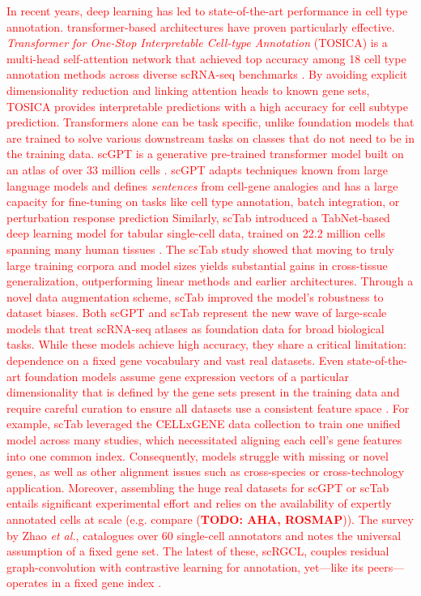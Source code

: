 \documentclass{article}
\newcommand{\gpt}[1]{\textcolor{red}{#1}}
\begin{document}
\gpt{In recent years, deep learning has led to state-of-the-art performance in cell type annotation. transformer-based architectures have proven particularly effective. \textit{Transformer for One-Stop Interpretable Cell-type Annotation} (TOSICA) is a multi-head self-attention network that achieved top accuracy among 18 cell type annotation methods across diverse scRNA-seq benchmarks \cite{chen2023transformer}. By avoiding explicit dimensionality reduction and linking attention heads to known gene sets, TOSICA provides interpretable predictions with a high accuracy for cell subtype prediction. 
Transformers alone can be task specific, unlike foundation models that are trained to solve various downstream tasks on classes that do not need to be in the training data. 
scGPT is a generative pre-trained transformer model built on an atlas of over 33 million cells \cite{cui2024scgpt}. scGPT adapts techniques known from large language models and defines \textit{sentences} from cell-gene analogies and has a large capacity for fine-tuning on tasks like cell type annotation, batch integration, or perturbation response prediction
Similarly, scTab introduced a TabNet-based deep learning model for tabular single-cell data, trained on 22.2 million cells spanning many human tissues \cite{fischer2024sctab}. The scTab study showed that moving to truly large training corpora and model sizes yields substantial gains in cross-tissue generalization, outperforming linear methods and earlier architectures. Through a novel data augmentation scheme, scTab improved the model's robustness to dataset biases. Both scGPT and scTab represent the new wave of large-scale models that treat scRNA-seq atlases as foundation data for broad biological tasks. While these models achieve high accuracy, they share a critical limitation: dependence on a fixed gene vocabulary and vast real datasets. Even state-of-the-art foundation models assume gene expression vectors of a particular dimensionality that is defined by the gene sets present in the training data and require careful curation to ensure all datasets use a consistent feature space \cite{fischer2024sctab}. For example, scTab leveraged the CELLxGENE data collection to train one unified model across many studies, which necessitated aligning each cell's gene features into one common index. Consequently, models struggle with missing or novel genes, as well as other alignment issues such as cross-species or cross-technology application. Moreover, assembling the huge real datasets for scGPT or scTab entails significant experimental effort and relies on the availability of expertly annotated cells at scale (e.g. compare \cite{flotho2024zebra, grandke2025single} (\textbf{TODO: AHA, ROSMAP})). The survey by Zhao \textit{et al.},\cite{zhao2023survey} catalogues over 60 single-cell annotators and notes the universal assumption of a fixed gene set. The latest of these, scRGCL, couples residual graph-convolution with contrastive learning for annotation, yet---like its peers---operates in a fixed gene index \cite{yuan2025scrgcl}.}
\end{document}
